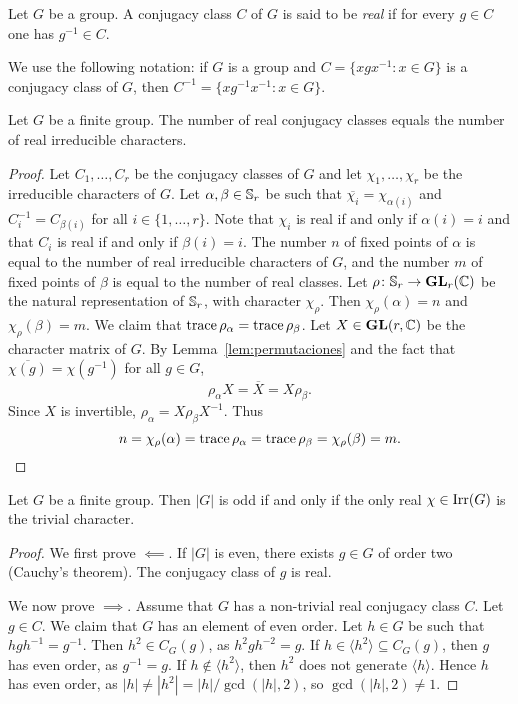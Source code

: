 \begin{definition}
  Let $G$ be a group. A conjugacy class $C$ of $G$ is said to be
  \emph{real} if for every $g\in C$ one has $g^{-1}\in C$. 
\end{definition}

We use the following notation: if $G$ is a group and $C=\{xgx^{-1}:x\in G\}$ is a conjugacy class of  
$G$, then $C^{-1}=\{xg^{-1}x^{-1}:x\in G\}$.  

\begin{theorem}[Burnside]
    Let $G$ be a finite group. The number of real conjugacy classes 
    equals the number of real irreducible characters. 
\end{theorem}

\begin{proof}
  Let $C_1,\dots,C_r$ be the conjugacy classes of $G$ and  
  let $\chi_1,\dots,\chi_r$ be the irreducible characters of $G$. 
  Let $\alpha,\beta\in\mathbb{S}_r$ be such that $\overline{\chi_i}=\chi_{\alpha(i)}$ and 
  $C_i^{-1}=C_{\beta(i)}$ for all $i\in\{1,\dots,r\}$. Note that $\chi_i$
  is real if and only if $\alpha(i)=i$ and that $C_i$ is real if and only if 
  $\beta(i)=i$. The number $n$ of fixed points of $\alpha$ is equal to the number
  of real irreducible characters of $G$, and the number $m$ of fixed points of $\beta$ is equal
  to the number of real classes. 
  Let $\rho\colon\mathbb{S}_r\to\mathbf{GL}_r(\mathbb{C})$ be the natural representation of $\mathbb{S}_r$, with character $\chi_\rho$.
  Then $\chi_\rho(\alpha)=n$ and $\chi_\rho(\beta)=m$. We claim that 
  $\operatorname{trace}\rho_\alpha=\operatorname{trace}\rho_\beta$. 
  Let $X\in\mathbf{GL}(r,\mathbb{C})$ be the character matrix of $G$. 
  By Lemma~\ref{lem:permutaciones} 
  and the fact that $\overline{\chi(g)}=\chi(g^{-1})$ for all $g\in G$, 
  \[
	\rho_\alpha X=\overline{X}=X\rho_\beta.
  \]
  Since $X$ is invertible, $\rho_{\alpha}=X\rho_{\beta}X^{-1}$. Thus 
  \[
    n=\chi_{\rho}(\alpha)=\operatorname{trace}\rho_{\alpha}=\operatorname{trace}\rho_{\beta}=\chi_{\rho}(\beta)=m.\qedhere
  \]
\end{proof}

\begin{corollary}
  \label{corollary:|G|impar}
  Let $G$ be a finite group. Then $|G|$ is odd if and only if
  the only real $\chi\in\operatorname{Irr}(G)$ is the trivial character. 
\end{corollary}

\begin{proof}
    We first prove $\impliedby$. If $|G|$ is even, there exists 
    $g\in G$ of order two (Cauchy's theorem). The conjugacy class of $g$ 
    is real. 

    We now prove $\implies$. Assume that $G$ has a non-trivial 
    real conjugacy class $C$. Let $g\in C$. We claim that 
    $G$ has an element of even order. Let $h\in G$ be such that
    $hgh^{-1}=g^{-1}$. Then $h^2\in C_G(g)$, as $h^2gh^{-2}=g$. 
    If $h\in\langle h^2\rangle\subseteq C_G(g)$, then $g$ has 
    even order, as $g^{-1}=g$. If $h\not\in\langle h^2\rangle$, then 
    $h^2$ does not generate $\langle h\rangle$. Hence $h$ has even order, 
    as $|h|\ne|h^2|=|h|/\gcd(|h|,2)$, so $\gcd(|h|,2)\ne 1$.  
\end{proof}


